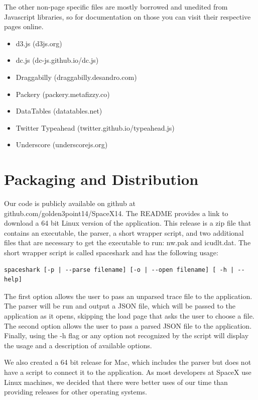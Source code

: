 \documentclass{hmcclinic}
\begin{document}
  The other non-page specific files are mostly borrowed and unedited from
  Javascript libraries, so for documentation on those you can visit their
  respective pages online.
\begin{itemize}
\item d3.js (d3js.org)
\item dc.js (dc-js.github.io/dc.js)
\item Draggabilly (draggabilly.desandro.com)
\item Packery (packery.metafizzy.co)
\item DataTables (datatables.net)
\item Twitter Typeahead (twitter.github.io/typeahead.js)
\item Underscore (underscorejs.org)
\end{itemize}

\section{Packaging and Distribution}
  Our code is publicly available on github at
  github.com/golden3point14/SpaceX14. The README provides a link to download a
  64 bit Linux version of the application. This release is a zip file that
  contains an executable, the parser, a short wrapper script, and two additional
  files that are necessary to get the executable to run: nw.pak and icudlt.dat.
  The short wrapper script is called spaceshark and has the following usage:

\begin{verbatim}spaceshark [-p | --parse filename] [-o | --open filename] [ -h | --help]\end{verbatim}

  The first option allows the user to pass an unparsed trace file to the
  application. The parser will be run and output a JSON file, which will be
  passed to the application as it opens, skipping the load page that asks the
  user to choose a file. The second option allows the user to pass a parsed
  JSON file to the application. Finally, using the -h flag or any option
  not recognized by the script will display the usage and a description of
  available options.

  We also created a 64 bit release for Mac, which includes the parser but does
  not have a script to connect it to the application. As most developers at
  SpaceX use Linux machines, we decided that there were better uses of our time
  than providing releases for other operating systems.
\end{document}
